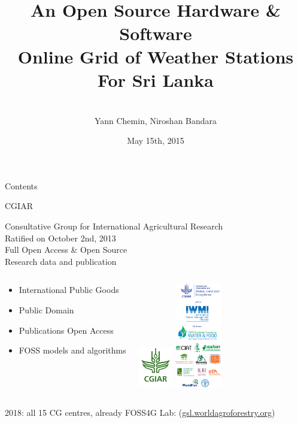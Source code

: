 \documentclass[xcolor=dvipsnames,beamer,unknownkeysallowed]{beamer} %
\title[IWMI - OSHW]
{\ \\
\ \\
An Open Source Hardware \& Software\\
Online Grid of Weather Stations\\
For Sri Lanka}
\author[Chemin, Bandara]
{\vspace{30pt}\\
Yann Chemin, Niroshan Bandara}
\institute[IWMI - U of Moratuwa]
{International Water Management Institute\\
 \vspace{5pt}
 University of Moratuwa - Town and Country Planning Department\\
\begin{center}
\end{center}
}
\date{\tiny May 15th, 2015}
\begin{document}
\begin{frame}
 \maketitle
\end{frame}

\begin{frame}{Contents}
 \begin{multicols}{2}
  \setcounter{tocdepth}{2}  
  \tableofcontents
 \end{multicols} 
\end{frame}

\begin{frame}[fragile]{CGIAR}

Consultative Group for International Agricultural Research\\
Ratified on October 2nd, 2013\\
Full Open Access \& Open Source\\
Research data and publication

\begin{columns}
\begin{center}
\begin{itemize}
 \item International Public Goods
 \item Public Domain
 \item Publications Open Access
 \item FOSS models and algorithms
\end{itemize}
\end{center}

\begin{center}
  \includegraphics[width=1.5cm]{CGIAR_Green}
  \hspace{5mm}
  \includegraphics[width=2cm]{WLE_and_partners-vertical_logo_strip.png}
\end{center}
\end{columns}
\vspace{5mm} 2018: all 15 CG centres, already FOSS4G Lab:
(\href{http://gsl.worldagroforestry.org}{gsl.worldagroforestry.org})
\end{frame}
\end{document}
